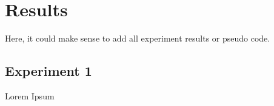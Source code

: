 
\chapter{Results}
\label{appendix:results}
%
Here, it could make sense to add all experiment results or pseudo code.


\section{Experiment 1}
\label{appendix:results:experiment_1}
%
Lorem Ipsum